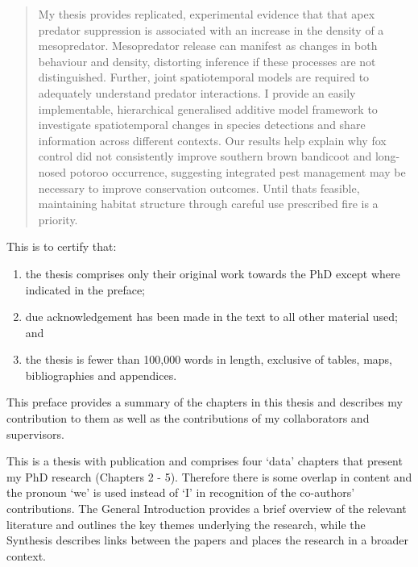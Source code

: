 \documentclass[11pt,a4paper,titlepage,twoside,openright]{style/unimelbthesis}
\begin{document}
\begin{frontmatter}
\begin{abstract}
    My thesis provides replicated, experimental evidence that that apex predator suppression is associated with an increase in the density of a mesopredator. Mesopredator release can manifest as changes in both behaviour and density, distorting inference if these processes are not distinguished. Further, joint spatiotemporal models are required to adequately understand predator interactions. I provide an easily implementable, hierarchical generalised additive model framework to investigate spatiotemporal changes in species detections and share information across different contexts. Our results help explain why fox control did not consistently improve southern brown bandicoot and long-nosed potoroo occurrence, suggesting integrated pest management may be necessary to improve conservation outcomes. Until thats feasible, maintaining habitat structure through careful use prescribed fire is a priority.
  \end{abstract}
  \begin{declaration}
    This is to certify that:
    \begin{enumerate}
    \def\labelenumi{\roman{enumi}.}
    \tightlist
    \item
      the thesis comprises only their original work towards the PhD except where indicated in the preface;
    \item
      due acknowledgement has been made in the text to all other material
      used; and
    \item
      the thesis is fewer than 100,000 words in length, exclusive of
      tables, maps, bibliographies and appendices.
    \end{enumerate}
  \end{declaration}
  \begin{preface}
    This preface provides a summary of the chapters in this thesis and describes my contribution to them as well as the contributions of my collaborators and supervisors.
    
    This is a thesis with publication and comprises four `data' chapters that present my PhD research (Chapters 2 - 5). Therefore there is some overlap in content and the pronoun `we' is used instead of `I' in recognition of the co-authors' contributions. The General Introduction provides a brief overview of the relevant literature and outlines the key themes underlying the research, while the Synthesis describes links between the papers and places the research in a broader context.
    

\end{preface}
\end{frontmatter}
\end{document}
